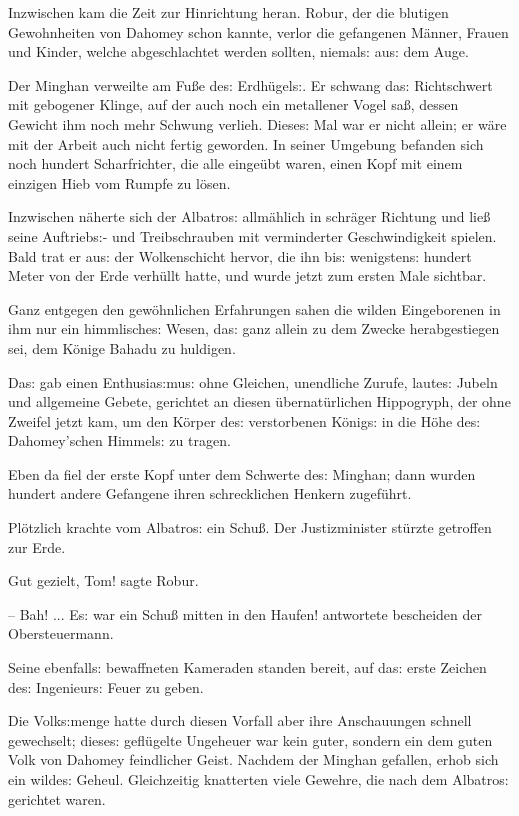 \documentclass[oneside,12pt]{book}
\newcommand{\s}{s:}
\begin{document}
Inzwischen kam die Zeit zur Hinrichtung heran. Robur, der die
blutigen Gewohnheiten von Dahomey schon kannte, verlor die gefangenen
M\"anner, Frauen und Kinder, welche abgeschlachtet werden sollten,
niemal{\s} au{\s} dem Auge.

Der Minghan verweilte am Fu{\ss}e de{\s} Erdh\"ugel{\s}. Er schwang
da{\s} Richtschwert mit gebogener Klinge, auf der auch noch ein
metallener Vogel sa{\ss}, dessen Gewicht ihm noch mehr Schwung
verlieh. Diese{\s} Mal war er nicht allein; er w\"are mit der Arbeit
auch nicht fertig geworden. In seiner Umgebung befanden sich noch
hundert Scharfrichter, die alle einge\"ubt waren, einen Kopf mit
einem einzigen Hieb vom Rumpfe zu l\"osen.

Inzwischen n\"aherte sich der {\glqq}Albatro{\s}{\grqq} allm\"ahlich
in schr\"ager Richtung und lie{\ss} seine Auftrieb{\s}- und
Treibschrauben mit verminderter Geschwindigkeit spielen. Bald trat er
au{\s} der Wolkenschicht hervor, die ihn bi{\s} wenigsten{\s} hundert
Meter von der Erde verh\"ullt hatte, und wurde jetzt zum ersten Male
sichtbar.

Ganz entgegen den gew\"ohnlichen Erfahrungen sahen die wilden
Eingeborenen in ihm nur ein himmlische{\s} Wesen, da{\s} ganz allein
zu dem Zwecke herabgestiegen sei, dem K\"onige Bahadu zu huldigen.

Da{\s} gab einen Enthusia{\s}mu{\s} ohne Gleichen, unendliche Zurufe,
laute{\s} Jubeln und allgemeine Gebete, gerichtet an diesen
\"ubernat\"urlichen Hippogryph, der ohne Zweifel jetzt kam, um den
K\"orper de{\s} verstorbenen K\"onig{\s} in die H\"ohe de{\s}
Dahomey'schen Himmel{\s} zu tragen.

Eben da fiel der erste Kopf unter dem Schwerte de{\s} Minghan; dann
wurden hundert andere Gefangene ihren schrecklichen Henkern
zugef\"uhrt.

Pl\"otzlich krachte vom {\glqq}Albatro{\s}{\grqq} ein Schu{\ss}. Der
Justizminister st\"urzte getroffen zur Erde.

{\glqq}Gut gezielt, Tom! sagte Robur.

-- Bah! ... E{\s} war ein Schu{\ss} mitten in den Haufen!{\grqq}
antwortete bescheiden der Obersteuermann.

Seine ebenfall{\s} bewaffneten Kameraden standen bereit, auf da{\s}
erste Zeichen de{\s} Ingenieur{\s} Feuer zu geben.

Die Volk{\s}menge hatte durch diesen Vorfall aber ihre Anschauungen
schnell gewechselt; diese{\s} gefl\"ugelte Ungeheuer war kein guter,
sondern ein dem guten Volk von Dahomey feindlicher Geist. Nachdem der
Minghan gefallen, erhob sich ein wilde{\s} Geheul. Gleichzeitig
knatterten viele Gewehre, die nach dem {\glqq}Albatro{\s}{\grqq}
gerichtet waren.
\end{document}
